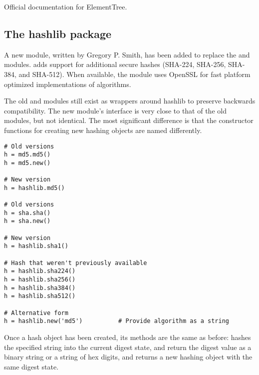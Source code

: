 \documentclass{howto}
\begin{document}
\begin{seealso}

{Official documentation for ElementTree.}

\end{seealso}


\subsection{The hashlib package\label{module-hashlib}}

A new  module, written by Gregory P. Smith, 
has been added to replace the
 and  modules.   adds support
for additional secure hashes (SHA-224, SHA-256, SHA-384, and SHA-512).
When available, the module uses OpenSSL for fast platform optimized
implementations of algorithms.  

The old  and  modules still exist as wrappers
around hashlib to preserve backwards compatibility.  The new module's
interface is very close to that of the old modules, but not identical.
The most significant difference is that the constructor functions
for creating new hashing objects are named differently.

\begin{verbatim}
# Old versions
h = md5.md5()   
h = md5.new()   

# New version 
h = hashlib.md5()

# Old versions
h = sha.sha()   
h = sha.new()   

# New version 
h = hashlib.sha1()

# Hash that weren't previously available
h = hashlib.sha224()
h = hashlib.sha256()
h = hashlib.sha384()
h = hashlib.sha512()

# Alternative form
h = hashlib.new('md5')          # Provide algorithm as a string
\end{verbatim}

Once a hash object has been created, its methods are the same as before:
 hashes the specified string into the 
current digest state,  and 
return the digest value as a binary string or a string of hex digits,
and  returns a new hashing object with the same digest state.

\begin{seealso}


\end{seealso}
\end{document}
